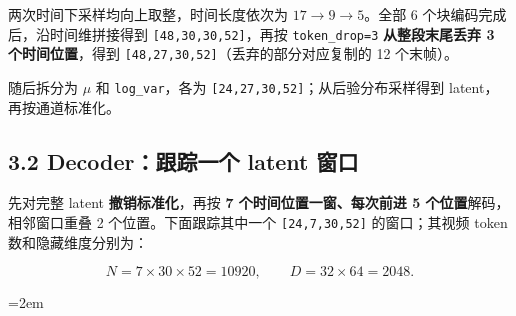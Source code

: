 \documentclass[
  11pt,
  a4paper,
  fontset=none]{ctexart}
\newcommand{\NotesTableStyle}{\linespread{1}\fontsize{9.5pt}{13pt}\selectfont\setlength{\tabcolsep}{4pt}\renewcommand{\arraystretch}{1.1}\setlength{\extrarowheight}{5pt}\setlength{\LTpre}{5pt}\setlength{\LTpost}{6pt}\setlength{\parskip}{0pt}\emergencystretch=2em}
\begin{document}
\endgroup

两次时间下采样均向上取整，时间长度依次为
\textbf{\(17\rightarrow9\rightarrow5\)}。全部 6
个块编码完成后，沿时间维拼接得到 \texttt{{[}48,30,30,52{]}}，再按
\texttt{token\_drop=3} \textbf{从整段末尾丢弃 3 个时间位置}，得到
\texttt{{[}48,27,30,52{]}}（丢弃的部分对应复制的 12 个末帧）。

随后拆分为 \(\mu\) 和 \texttt{log\_var}，各为
\texttt{{[}24,27,30,52{]}}；从后验分布采样得到 latent，再按通道标准化。


\subsection{3.2 Decoder：跟踪一个 latent 窗口}\label{h3-decoder}

先对完整 latent \textbf{撤销标准化}，再按 \textbf{7
个时间位置一窗、每次前进 5 个位置}解码，相邻窗口重叠 2
个位置。下面跟踪其中一个 \texttt{{[}24,7,30,52{]}} 的窗口；其视频 token
数和隐藏维度分别为：

\[
N=7\times30\times52=10920,\qquad D=32\times64=2048.
\]

\begingroup\NotesTableStyle\fontsize{10.5pt}{14pt}\selectfont\renewcommand{\arraystretch}{1.08}\setlength{\extrarowheight}{3pt}
\end{document}
